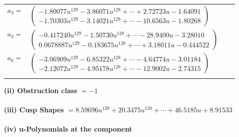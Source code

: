 \documentclass[1p]{elsarticle_modified}
\theoremstyle{definition}
\begin{document}
\begin{tabular}{m{7pt} m{180pt} m{7pt} m{180pt} }
\flushright $a_{3}=$&$\begin{pmatrix}-1.80077 u^{129}-3.86071 u^{128}+\cdots+2.72723 u-1.64091\\-1.70303 u^{129}-3.14021 u^{128}+\cdots-10.6563 u-1.80268\end{pmatrix}$ \\
\flushright $a_{2}=$&$\begin{pmatrix}-0.417240 u^{129}-1.50730 u^{128}+\cdots-28.9400 u-3.28010\\0.0678887 u^{129}-0.183675 u^{128}+\cdots+3.18011 u-0.444522\end{pmatrix}$ \\
\flushright $a_{6}=$&$\begin{pmatrix}-3.06909 u^{129}-6.85322 u^{128}+\cdots-4.64774 u-3.01184\\-2.12072 u^{129}-4.95178 u^{128}+\cdots-12.9002 u-2.74315\end{pmatrix}$\\&\end{tabular}
\flushleft \textbf{(ii) Obstruction class $= -1$}\\~\\
\flushleft \textbf{(iii) Cusp Shapes $= 8.59696 u^{129}+20.3475 u^{128}+\cdots+46.5185 u+8.91533$}\\~\\
\newpage\renewcommand{\arraystretch}{1}
\flushleft \textbf{(iv) u-Polynomials at the component}\newline \\
\end{document}
